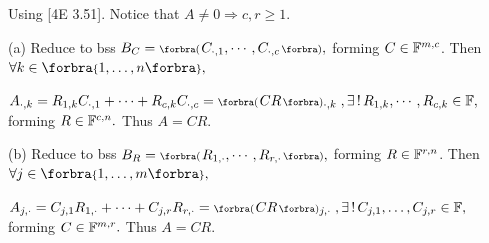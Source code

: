 Using [4E 3.51]. Notice that $A\neq 0\Rightarrow c,r\geqslant 1.$\vspace{2pt}\par\quad
(a) Reduce to bss $B_C=\BigPar{C_{\cdot,1},\cdots,C_{\cdot,c}},$ forming $C\in{\mathbb{F}}^{m,c}$. Then $\forall k\in\Bra{1,\dots,n},$\vspace{2pt}\par\quad\Ha
$A_{\cdot,k}=R_{1,k}C_{\cdot,1}+\dots+R_{c,k}C_{\cdot,c}=\BigPar{CR}{_{\cdot,k}}\;,\exists\,!\,R_{1,k},\cdots,R_{c,k}\in\Fbb,$ forming $R\in{\mathbb{F}}^{c,n}.$ Thus $A=CR.$\vspace{4pt}\par\quad
(b) Reduce to bss $B_R=\BigPar{R_{1,\cdot},\cdots,R_{r,\cdot}},$ forming $R\in{\mathbb{F}}^{r,n}$. Then $\forall j\in\Bra{1,\dots,m},$\vspace{2pt}\par\quad\Hb
$A_{j,\cdot}=C_{j,1}R_{1,\cdot}+\dots+C_{j,r}R_{r,\cdot}=\BigPar{CR}{_{j,\cdot}}\;,\exists\,!\,C_{j,1},\dots,C_{j,r}\in\Fbb,$ forming $C\in{\mathbb{F}}^{m,r}.$ Thus $A=CR.$\PfEnd\vspace{6pt}
